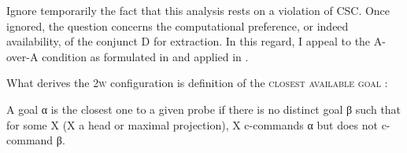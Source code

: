 \documentclass[output=paper]{langsci/langscibook}
\begin{document}
Ignore temporarily the fact that this analysis rests on a violation of
\gls{CSC}. Once ignored, the question
concerns the computational preference, or indeed availability, of the conjunct
D for extraction.  In this regard, I appeal to the A-over-A condition
as formulated in \citet{RackRich2005} and applied in \citet{Roberts2010}.

What derives the \textsc{2w} configuration is
 definition of the \textsc{closest available goal} :

\begin{exe}
	\ex A goal α is the closest one to a given probe if there is no distinct
    goal β such that for some X (X a head or maximal projection), X c-commands
    α but does not c-command β. \citep[579]{RackRich2005}\label{ex:18.26}
\end{exe}
\end{document}
